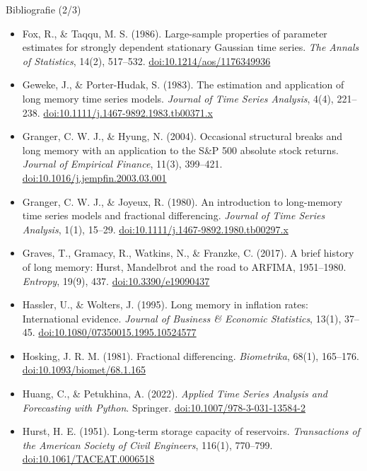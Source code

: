 \begin{frame}{Bibliografie (2/3)}
\itemsize{\scriptsize}
\begin{itemize}
    \item Fox, R., \& Taqqu, M. S. (1986). Large-sample properties of parameter estimates for strongly dependent stationary Gaussian time series. \textit{The Annals of Statistics}, 14(2), 517--532. \href{https://doi.org/10.1214/aos/1176349936}{doi:10.1214/aos/1176349936}
    \item Geweke, J., \& Porter-Hudak, S. (1983). The estimation and application of long memory time series models. \textit{Journal of Time Series Analysis}, 4(4), 221--238. \href{https://doi.org/10.1111/j.1467-9892.1983.tb00371.x}{doi:10.1111/j.1467-9892.1983.tb00371.x}
    \item Granger, C. W. J., \& Hyung, N. (2004). Occasional structural breaks and long memory with an application to the S\&P 500 absolute stock returns. \textit{Journal of Empirical Finance}, 11(3), 399--421. \href{https://doi.org/10.1016/j.jempfin.2003.03.001}{doi:10.1016/j.jempfin.2003.03.001}
    \item Granger, C. W. J., \& Joyeux, R. (1980). An introduction to long-memory time series models and fractional differencing. \textit{Journal of Time Series Analysis}, 1(1), 15--29. \href{https://doi.org/10.1111/j.1467-9892.1980.tb00297.x}{doi:10.1111/j.1467-9892.1980.tb00297.x}
    \item Graves, T., Gramacy, R., Watkins, N., \& Franzke, C. (2017). A brief history of long memory: Hurst, Mandelbrot and the road to ARFIMA, 1951--1980. \textit{Entropy}, 19(9), 437. \href{https://doi.org/10.3390/e19090437}{doi:10.3390/e19090437}
    \item Hassler, U., \& Wolters, J. (1995). Long memory in inflation rates: International evidence. \textit{Journal of Business \& Economic Statistics}, 13(1), 37--45. \href{https://doi.org/10.1080/07350015.1995.10524577}{doi:10.1080/07350015.1995.10524577}
    \item Hosking, J. R. M. (1981). Fractional differencing. \textit{Biometrika}, 68(1), 165--176. \href{https://doi.org/10.1093/biomet/68.1.165}{doi:10.1093/biomet/68.1.165}
    \item Huang, C., \& Petukhina, A. (2022). \textit{Applied Time Series Analysis and Forecasting with Python}. Springer. \href{https://doi.org/10.1007/978-3-031-13584-2}{doi:10.1007/978-3-031-13584-2}
    \item Hurst, H. E. (1951). Long-term storage capacity of reservoirs. \textit{Transactions of the American Society of Civil Engineers}, 116(1), 770--799. \href{https://doi.org/10.1061/TACEAT.0006518}{doi:10.1061/TACEAT.0006518}
\end{itemize}
\end{frame}


